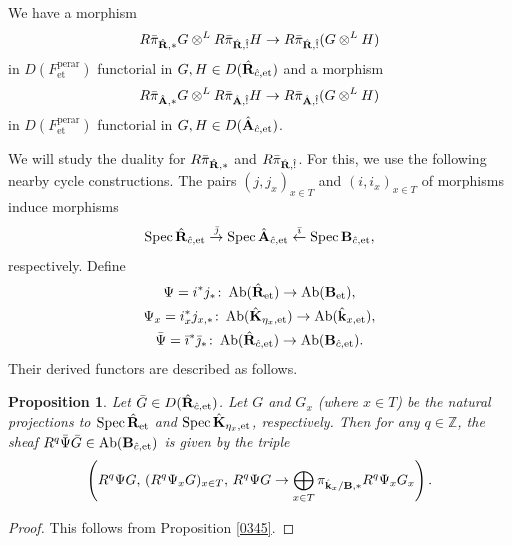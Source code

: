 \documentclass{amsart}
\newtheorem{Prop}[Thm]{Proposition}
\theoremstyle{remark}
\numberwithin{equation}{subsection}
\newcommand{\tensor}{\mathbin{\otimes}}
\newcommand{\Z}{\mathbb{Z}}
\newcommand{\et}{\mathrm{et}}
\newcommand{\perar}{\mathrm{perar}}
\newcommand{\alg}[1]{\mathbf{#1}}
\DeclareMathOperator{\Spec}{Spec}
\DeclareMathOperator{\Ab}{Ab}
\begin{document}
We have a morphism
	\begin{equation} \label{0344}
				R \Bar{\pi}_{\Hat{\alg{R}}, \ast} G
			\tensor^{L}
				R \Bar{\pi}_{\Hat{\alg{R}}, \Hat{!}} H
		\to
			R \Bar{\pi}_{\Hat{\alg{R}}, \Hat{!}}(G \tensor^{L} H)
	\end{equation}
in $D(F^{\perar}_{\et})$ functorial in $G, H \in D(\Hat{\alg{R}}_{\Hat{c}, \et})$
and a morphism
	\[
				R \Bar{\pi}_{\Hat{\alg{A}}, \ast} G
			\tensor^{L}
				R \Bar{\pi}_{\Hat{\alg{A}}, \Hat{!}} H
		\to
			R \Bar{\pi}_{\Hat{\alg{A}}, \Hat{!}}(G \tensor^{L} H)
	\]
in $D(F^{\perar}_{\et})$ functorial in $G, H \in D(\Hat{\alg{A}}_{\Hat{c}, \et})$.

We will study the duality for
$R \Bar{\pi}_{\Hat{\alg{R}}, \ast}$ and $R \Bar{\pi}_{\Hat{\alg{R}}, \Hat{!}}$.
For this, we use the following nearby cycle constructions.
The pairs $(j, j_{x})_{x \in T}$ and $(i, i_{x})_{x \in T}$ of morphisms induce morphisms
	\[
			\Spec \Hat{\alg{R}}_{\Hat{c}, \et}
		\stackrel{\Bar{\jmath}}{\to}
			\Spec \Hat{\alg{A}}_{\Hat{c}, \et}
		\stackrel{\Bar{\imath}}{\gets}
			\Spec \alg{B}_{\Hat{c}, \et},
	\]
respectively.
Define
	\begin{gather*}
					\Psi
				=
					i^{\ast} j_{\ast}
			\colon
				\Ab(\Hat{\alg{R}}_{\et})
			\to
				\Ab(\alg{B}_{\et}),
		\\
					\Psi_{x}
				=
					i_{x}^{\ast} j_{x, \ast}
			\colon
				\Ab(\Hat{\alg{K}}_{\eta_{x}, \et})
			\to
				\Ab(\Hat{\alg{k}}_{x, \et}),
		\\
					\Bar{\Psi}
				=
					\Bar{\imath}^{\ast} \Bar{\jmath}_{\ast}
			\colon
				\Ab(\Hat{\alg{R}}_{\Hat{c}, \et})
			\to
				\Ab(\alg{B}_{\Hat{c}, \et}).
	\end{gather*}
Their derived functors are described as follows.

\begin{Prop} \label{0349}
	Let $\Bar{G} \in D(\Hat{\alg{R}}_{\Hat{c}, \et})$.
	Let $G$ and $G_{x}$ (where $x \in T$) be the natural projections
	to $\Spec \Hat{\alg{R}}_{\et}$ and $\Spec \Hat{\alg{K}}_{\eta_{x}, \et}$, respectively.
	Then for any $q \in \Z$,
	the sheaf $R^{q} \Bar{\Psi} \Bar{G} \in \Ab(\alg{B}_{\Hat{c}, \et})$ is given by the triple
		\[
			\left(
				R^{q} \Psi G,\,
				(R^{q} \Psi_{x} G)_{x \in T},\,
					R^{q} \Psi G
				\to
					\bigoplus_{x \in T}
						\pi_{\Hat{\alg{k}}_{x} / \alg{B}, \ast}
						R^{q} \Psi_{x} G_{x}
			\right).
		\]
\end{Prop}

\begin{proof}
	This follows from Proposition \ref{0345}.
\end{proof}
\end{document}
